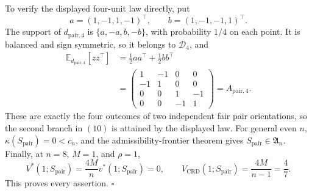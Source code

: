 To verify the displayed four-unit law directly, put
\[
a=(1,-1,1,-1)^\top,
\qquad
b=(1,-1,-1,1)^\top.
\]
The support of \(d_{\mathrm{pair},4}\) is \(\{a,-a,b,-b\}\), with probability \(1/4\) on each point. It is balanced and sign symmetric, so it belongs to \(\mathcal D_4\), and
\[
\begin{aligned}
\mathbb E_{d_{\mathrm{pair},4}}[zz^\top]
&=\frac12aa^\top+\frac12bb^\top\\
&=\begin{pmatrix}
1&-1&0&0\\
-1&1&0&0\\
0&0&1&-1\\
0&0&-1&1
\end{pmatrix}
=A_{\mathrm{pair},4}.
\end{aligned}
\tag{11}
\]
These are exactly the four outcomes of two independent fair pair orientations, so the second branch in \((10)\) is attained by the displayed law. For general even \(n\), \(\kappa(S_{\mathrm{pair}})=0<c_n\), and the admissibility-frontier theorem gives \(S_{\mathrm{pair}}\in\mathfrak A_n\). Finally, at \(n=8\), \(M=1\), and \(\rho=1\),
\[
V^*(1;S_{\mathrm{pair}})
=\frac{4M}{n}v^*(1;S_{\mathrm{pair}})=0,
\qquad
V_{\mathrm{CRD}}(1;S_{\mathrm{pair}})=\frac{4M}{n-1}=\frac47.
\tag{12}
\]
This proves every assertion. \(\square\)